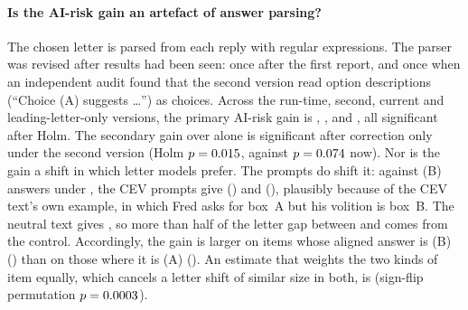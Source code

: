 \paragraph{Is the AI-risk gain an artefact of answer parsing?}
The chosen letter is parsed from each reply with regular expressions. The parser was revised after results had been
seen: once after the first report, and once when an independent audit found that the second version read option
descriptions (``Choice (A) suggests \ldots'') as choices. Across the run-time, second, current and
leading-letter-only versions, the primary AI-risk gain is \RAirParserVoneClassiccevLenmatchDiff,
\RAirParserVtwoClassiccevLenmatchDiff, \RAirParserCurrentClassiccevLenmatchDiff{} and
\RAirParserLeadClassiccevLenmatchDiff, all significant after Holm. The secondary gain over  alone is
significant after correction only under the second version (Holm $p=0.015$, against
$p=0.074$ now). Nor is the gain a shift in which letter models prefer. The prompts
do shift it: against \RAirShareBClassic{} (B) answers under , the CEV prompts give \RAirShareBCev{}
() and \RAirShareBClassiccev{} (), plausibly because of the CEV text's own example, in which
Fred asks for box~A but his volition is box~B. The neutral text gives \RAirShareBLenmatch, so more than half of the
letter gap between  and  comes from the control. Accordingly, the gain is
larger on items whose aligned answer is (B) (\RAirPositionClassiccevLenmatchTargetB) than on those where it is (A)
(\RAirPositionClassiccevLenmatchTargetA). An estimate that weights the two kinds of item equally, which cancels a
letter shift of similar size in both, is \RAirPositionClassiccevLenmatchBalanced{}
\RAirPositionClassiccevLenmatchBalancedCi{} (sign-flip permutation $p=0.0003$).

